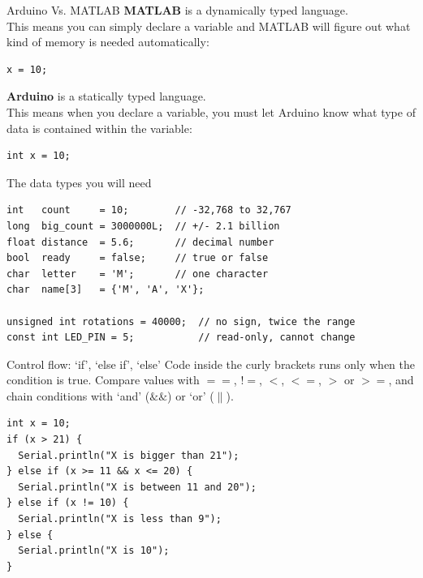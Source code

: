 \documentclass[aspectratio=169]{beamer}
\begin{document}
\begin{frame}[fragile]{Arduino Vs. MATLAB}
    \Large
    \textbf{MATLAB} is a dynamically typed language.\\
    This means you can simply declare a variable and MATLAB will figure out what kind of memory is needed automatically:\\
    \vspace{-1.5em}
    \begin{verbatim}
x = 10;
\end{verbatim}

    \vspace{1em}
    \textbf{Arduino} is a statically typed language.\\
    This means when you declare a variable, you must let Arduino know what type of data is contained within the variable:\\
    \vspace{-1.5em}
    \begin{verbatim}
int x = 10;
\end{verbatim}

\end{frame}

\begin{frame}[fragile]{The data types you will need}
    \normalsize
    \begin{verbatim}
int   count     = 10;        // -32,768 to 32,767
long  big_count = 3000000L;  // +/- 2.1 billion
float distance  = 5.6;       // decimal number
bool  ready     = false;     // true or false
char  letter    = 'M';       // one character
char  name[3]   = {'M', 'A', 'X'};

unsigned int rotations = 40000;  // no sign, twice the range
const int LED_PIN = 5;           // read-only, cannot change
\end{verbatim}
\end{frame}

\begin{frame}[fragile]{Control flow: `if', `else if', `else'}
    \normalsize
    Code inside the curly brackets runs only when the condition is true. Compare values with $==$, $!=$, $<$, $<=$, $>$ or $>=$, and chain conditions with `and'  ($\&\&$) or `or' ($\|$).\\
    \vspace{-.5em}
    \begin{verbatim}
int x = 10;
if (x > 21) {
  Serial.println("X is bigger than 21");
} else if (x >= 11 && x <= 20) {
  Serial.println("X is between 11 and 20");
} else if (x != 10) {
  Serial.println("X is less than 9");
} else {
  Serial.println("X is 10");
}
\end{verbatim}
\end{frame}
\end{document}
